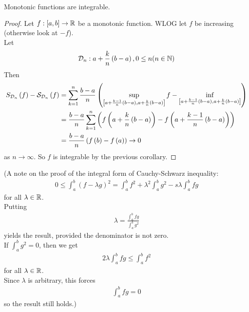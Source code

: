 \documentclass[a4paper]{article}
\begin{document}
\begin{thm}
Monotonic functions are integrable.
\begin{proof}
Let $f:\left[a,b\right] \to \mathbb{R}$ be a monotonic function. WLOG let $f$ be increasing (otherwise look at $-f$).\\
Let
\begin{equation*}
\begin{aligned}
\mathcal{D}_n: a+\frac{k}{n}\left(b-a\right), 0\leq n (n\in \mathbb{N})
\end{aligned}
\end{equation*}
Then
\begin{equation*}
\begin{aligned}
S_{\mathcal{D}_n}\left(f\right) - \mathcal{S}_{\mathcal{D}_n} \left(f\right) &= \sum_{k=1}^n \frac{b-a}{n}\left(\sup_{\left[a+\frac{k-1}{n}\left(b-a\right),a+\frac{k}{n}\left(b-a\right)\right]} f - \inf_{\left[a+\frac{k-1}{n}\left(b-a\right),a+\frac{k}{n}\left(b-a\right)\right]}\right)\\
&= \frac{b-a}{n}\sum_{k=1}^n \left(f\left(a+\frac{k}{n}\left(b-a\right)\right) - f\left(a+\frac{k-1}{n}\left(b-a\right)\right)\right)\\
&= \frac{b-a}{n} \left(f\left(b\right) - f\left(a\right)\right) \to 0
\end{aligned}
\end{equation*}
as $n \to \infty$. So $f$ is integrable by the previous corollary.
\end{proof}
\end{thm}

(A note on the proof of the integral form of Cauchy-Schwarz inequality:
\begin{equation*}
\begin{aligned}
0\leq \int_a^b \left(f-\lambda g\right)^2 = \int_a^b f^2 + \lambda^2 \int_a^b g^2 - s\lambda \int_a^b fg
\end{aligned}
\end{equation*}
for all $\lambda \in \mathbb{R}$.\\
Putting
\begin{equation*}
\begin{aligned}
\lambda = \frac{\int_a^b fg}{\int_a^b g^2}
\end{aligned}
\end{equation*}
yields the result, provided the denominator is not zero.\\
If $\int_a^b g^2 = 0$, then we get
\begin{equation*}
\begin{aligned}
2\lambda \int_a^b fg \leq \int_a^b f^2
\end{aligned}
\end{equation*}
for all $\lambda \in \mathbb{R}$.\\
Since $\lambda$ is arbitrary, this forces
\begin{equation*}
\begin{aligned}
\int_a^b fg = 0
\end{aligned}
\end{equation*}
so the result still holds.)
\end{document}
